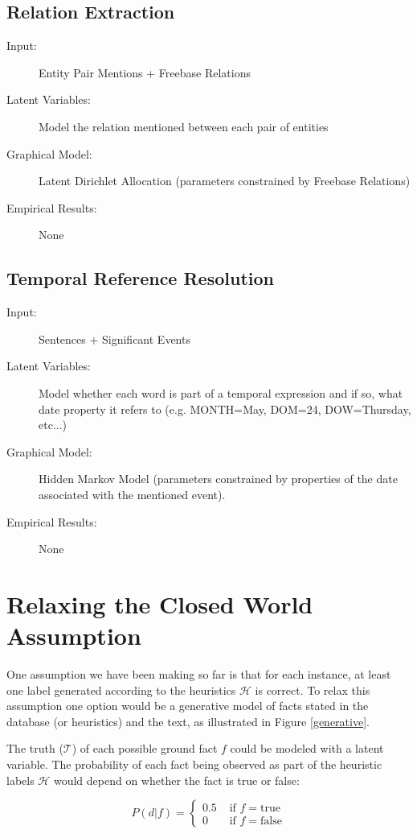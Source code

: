\documentclass[12pt]{article}
\begin{document}
\subsection{Relation Extraction}
\begin{description}
\item[Input:] Entity Pair Mentions + Freebase Relations
\item[Latent Variables:] Model the relation mentioned between each pair of entities
\item[Graphical Model:] Latent Dirichlet Allocation (parameters constrained by Freebase Relations)
\item[Empirical Results:] None
\end{description}

\subsection{Temporal Reference Resolution}
\begin{description}
\item[Input:] Sentences + Significant Events
\item[Latent Variables:] Model whether each word is part of a temporal expression and if so, what date property it refers to (e.g. MONTH=May, DOM=24, DOW=Thursday, etc...)
\item[Graphical Model:] Hidden Markov Model (parameters constrained by properties of the date associated with the mentioned event).
\item[Empirical Results:] None
\end{description}

\section{Relaxing the Closed World Assumption}
One assumption we have been making so far is that for each instance, at least one label generated according to the heuristics $\mathcal{H}$ is correct.
To relax this assumption one option would be a generative model of facts stated in the database (or heuristics) and the text, as illustrated in
Figure \ref{generative}.

The truth ($\mathcal{T}$) of each possible ground fact $f$ could be modeled with a latent variable.  The probability of each fact being observed
as part of the heuristic labels $\mathcal{H}$ would depend on whether the fact is true or false:

$$
P(d|f) = \left\{ \begin{array}{rl}
 0.5 &\mbox{ if $f=\text{true}$} \\
 0   &\mbox{ if $f=\text{false}$}
       \end{array} \right.
$$
\end{document}
